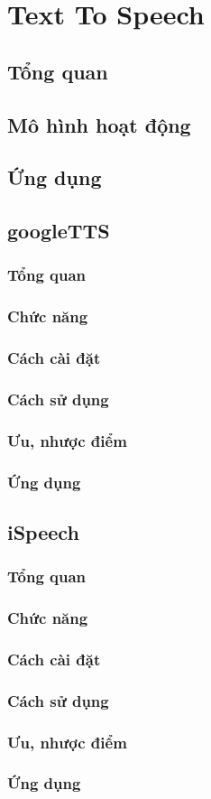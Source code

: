 \chapter{Text To Speech}
\ifpdf
    \graphicspath{{Chapter4/Chapter4Figs/PNG/}{Chapter4/Chapter4Figs/PDF/}{Chapter4/Chapter4Figs/}}
\else
    \graphicspath{{Chapter4/Chapter4Figs/EPS/}{Chapter4/Chapter4Figs/}}
\fi

\section{Tổng quan}
\section{Mô hình hoạt động}
\section{Ứng dụng}
\section{googleTTS}
\subsection{Tổng quan}
\subsection{Chức năng}
\subsection{Cách cài đặt}
\subsection{Cách sử dụng}
\subsection{Ưu, nhược điểm}
\subsection{Ứng dụng}
\section{iSpeech}
\subsection{Tổng quan}
\subsection{Chức năng}
\subsection{Cách cài đặt}
\subsection{Cách sử dụng}
\subsection{Ưu, nhược điểm}
\subsection{Ứng dụng}
